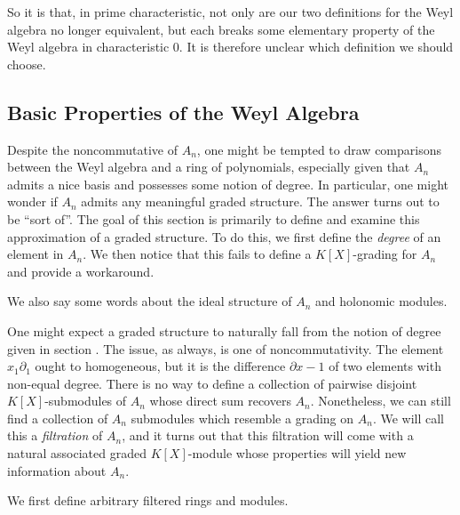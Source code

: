 So it is that, in prime characteristic, not only are our two definitions for the Weyl algebra no longer equivalent, but each breaks some elementary property of the Weyl algebra in characteristic 0. It is therefore unclear which definition we should choose.

\subsection{Basic Properties of the Weyl Algebra}

Despite the noncommutative of $A_n$, one might be tempted to draw comparisons between the Weyl algebra and a ring of polynomials, especially given that $A_n$ admits a nice basis and possesses some notion of degree. In particular, one might wonder if $A_n$ admits any meaningful graded structure. The answer turns out to be ``sort of''. The goal of this section is primarily to define and examine this approximation of a graded structure. To do this, we first define the \emph{degree} of an element in $A_n$. We then notice that this fails to define a $K[X]$-grading for $A_n$ and provide a workaround.

We also say some words about the ideal structure of $A_n$ and holonomic modules.

One might expect a graded structure to naturally fall from the notion of degree given in section . The issue, as always, is one of noncommutativity. The element $x_1\partial_1$ ought to homogeneous, but it is the difference $\partial x - 1$ of two elements with non-equal degree. There is no way to define a collection of pairwise disjoint $K[X]$-submodules of $A_n$ whose direct sum recovers $A_n$. Nonetheless, we can still find a collection of $A_n$ submodules which resemble a grading on $A_n$. We will call this a \emph{filtration} of $A_n$, and it turns out that this filtration will come with a natural associated graded $K[X]$-module whose properties will yield new information about $A_n$.

We first define arbitrary filtered rings and modules.

